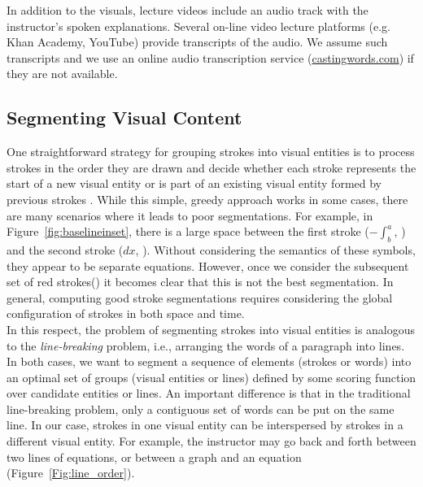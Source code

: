 In addition
to the visuals, lecture videos include an audio track with the instructor's
spoken explanations. Several on-line video lecture platforms (e.g. Khan Academy,
YouTube) provide transcripts of the audio. We assume such transcripts and
we use an online audio transcription service (\url{castingwords.com}) if they are
not available. 
%
\subsection{Segmenting Visual Content}
\label{sec:segmentation}
One straightforward strategy for grouping strokes into visual entities
is to process strokes in the order they are drawn and decide whether
each stroke represents the start of a new visual entity or is part of
an existing visual entity formed by previous strokes \cite{mynatt1999flatland}.
While this simple, greedy approach works in some cases, there are many
scenarios where it leads to poor segmentations. 
For example, in
Figure~\ref{fig:baselineinset}, there is a large space between the first stroke ($-\int^a_b$, ) and the second stroke ($dx$, ). Without considering the semantics of these symbols, 
they appear to be separate equations. However, once we consider 
the subsequent set of red strokes()
 it becomes clear that this is not the best segmentation. In general, computing good stroke segmentations requires considering
the global configuration of strokes in both space and time. \\

In this respect, the problem of segmenting strokes into visual
entities is analogous to the
\emph{line-breaking} problem, i.e., arranging the words of a paragraph
into lines.  In both cases, we want to segment a sequence of elements
(strokes or words) into an optimal set of groups (visual entities or
lines) defined by some scoring function over candidate entities or lines.
An important difference is that in the traditional line-breaking problem, only a
contiguous set of words can be put on the same line. In our case,
strokes in one visual entity can be interspersed by strokes in a
different visual entity. For example, the instructor may
go back and forth between two lines of equations, or
between a graph and an equation (Figure~\ref{Fig:line_order}).\\

